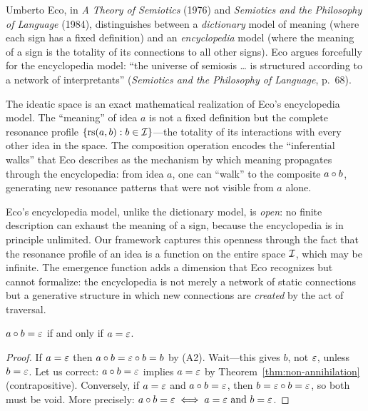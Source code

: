 \begin{interpretation}\label{interp:ch1:eco_encyclopedia}
Umberto Eco, in \emph{A Theory of Semiotics} (1976) and \emph{Semiotics
and the Philosophy of Language} (1984), distinguishes between a
\emph{dictionary} model of meaning (where each sign has a fixed definition)
and an \emph{encyclopedia} model (where the meaning of a sign is the
totality of its connections to all other signs). Eco argues forcefully for
the encyclopedia model: ``the universe of semiosis \ldots{} is structured
according to a network of interpretants'' (\emph{Semiotics and the
Philosophy of Language}, p.~68).

The ideatic space is an exact mathematical realization of Eco's encyclopedia
model. The ``meaning'' of idea $a$ is not a fixed definition but the
complete resonance profile $\{\mathrm{rs}(a, b) : b \in \mathcal{I}\}$---the totality of
its interactions with every other idea in the space. The composition
operation encodes the ``inferential walks'' that Eco describes as the
mechanism by which meaning propagates through the encyclopedia: from idea
$a$, one can ``walk'' to the composite $a \circ b$, generating new
resonance patterns that were not visible from $a$ alone.

Eco's encyclopedia model, unlike the dictionary model, is \emph{open}: no
finite description can exhaust the meaning of a sign, because the
encyclopedia is in principle unlimited. Our framework captures this openness
through the fact that the resonance profile of an idea is a function on the
entire space $\mathcal{I}$, which may be infinite. The emergence function adds a
dimension that Eco recognizes but cannot formalize: the encyclopedia is not
merely a network of static connections but a generative structure in which
new connections are \emph{created} by the act of traversal.
\end{interpretation}

\begin{corollary}\label{cor:compose-void-iff}
$a \circ b = \varepsilon$ if and only if $a = \varepsilon$.
\end{corollary}
\begin{proof}
If $a = \varepsilon$ then $a \circ b = \varepsilon \circ b = b$ by (A2).
Wait---this gives $b$, not $\varepsilon$, unless $b = \varepsilon$. Let us correct:
$a \circ b = \varepsilon$ implies $a = \varepsilon$ by Theorem~\ref{thm:non-annihilation}
(contrapositive). Conversely, if $a = \varepsilon$ and $a \circ b = \varepsilon$,
then $b = \varepsilon \circ b = \varepsilon$, so both must be void. More precisely:
$a \circ b = \varepsilon \iff a = \varepsilon \text{ and } b = \varepsilon$.
\end{proof}

